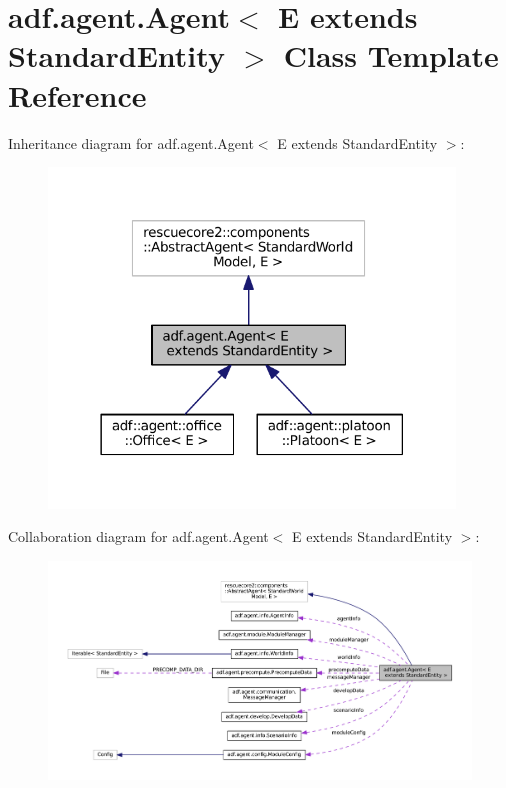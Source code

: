 \hypertarget{classadf_1_1agent_1_1Agent}{}\section{adf.\+agent.\+Agent$<$ E extends Standard\+Entity $>$ Class Template Reference}
\label{classadf_1_1agent_1_1Agent}


Inheritance diagram for adf.\+agent.\+Agent$<$ E extends Standard\+Entity $>$\+:
\nopagebreak
\begin{figure}[H]
\begin{center}
\leavevmode
\includegraphics[width=306pt]{classadf_1_1agent_1_1Agent__inherit__graph}
\end{center}
\end{figure}


Collaboration diagram for adf.\+agent.\+Agent$<$ E extends Standard\+Entity $>$\+:
\nopagebreak
\begin{figure}[H]
\begin{center}
\leavevmode
\includegraphics[width=350pt]{classadf_1_1agent_1_1Agent__coll__graph}
\end{center}
\end{figure}
